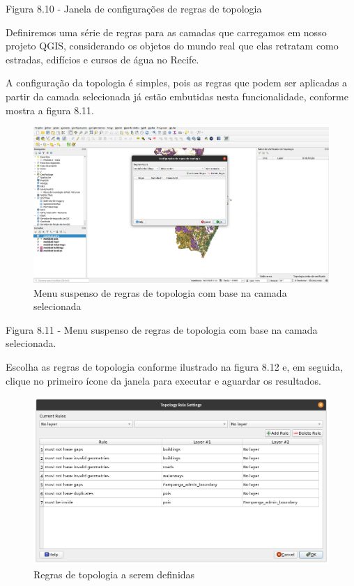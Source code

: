 \documentclass[
]{krantz}
\begin{document}
Figura 8.10 - Janela de configurações de regras de topologia

Definiremos uma série de regras para as camadas que carregamos em nosso projeto QGIS, considerando os objetos do mundo real que elas retratam como estradas, edifícios e cursos de água no Recife.

A configuração da topologia é simples, pois as regras que podem ser aplicadas a partir da camada selecionada já estão embutidas nesta funcionalidade, conforme mostra a figura 8.11.

\begin{figure}
\centering
\includegraphics{media/modulo8/fig811.png}
\caption{Menu suspenso de regras de topologia com base na camada selecionada}
\end{figure}

Figura 8.11 - Menu suspenso de regras de topologia com base na camada selecionada.

Escolha as regras de topologia conforme ilustrado na figura 8.12 e, em seguida, clique no primeiro ícone da janela para executar e aguardar os resultados.

\begin{figure}
\centering
\includegraphics{media/modulo8/fig812.png}
\caption{Regras de topologia a serem definidas}
\end{figure}
\end{document}
